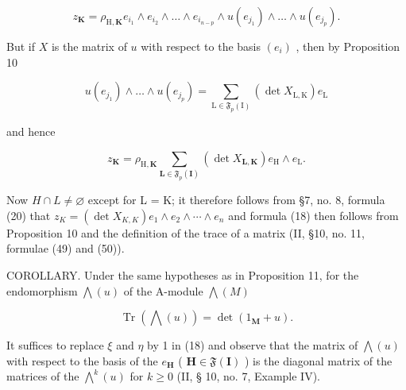 \[
z _ {\mathbf {K}} = \rho_ {\mathrm{H}, \mathbf {K}} e _ {i _ {1}} \wedge e _ {i _ {2}} \wedge \dots \wedge e _ {i _ {n - p}} \wedge u (e _ {j _ {1}}) \wedge \dots \wedge u (e _ {j _ {p}}).
\]

But if \(X\) is the matrix of \(u\) with respect to the basis \((e_i)\) , then by Proposition 10

\[
u (e _ {j _ {1}}) \wedge \dots \wedge u (e _ {j _ {p}}) = \sum_ {\mathrm{L} \in \mathfrak {F} _ {p} (\mathrm{I})} (\det X _ {\mathrm{L}, \mathrm{K}}) e _ {\mathrm{L}}
\]

and hence

\[
z _ {\mathbf {K}} = \rho_ {\mathrm{H}, \mathbf {K}} \sum_ {\mathbf {L} \in \mathfrak {F} _ {p} (\mathbf {I})} (\det X _ {\mathbf {L}, \mathbf {K}}) e _ {\mathrm{H}} \wedge e _ {\mathrm{L}}.
\]

Now \(H \cap L \neq \varnothing\) except for L = K; it therefore follows from §7, no. 8, formula (20) that \(z_{K} = (\det X_{K,K})e_{1} \wedge e_{2} \wedge \cdots \wedge e_{n}\) and formula (18) then follows from Proposition 10 and the definition of the trace of a matrix (II, §10, no. 11, formulae (49) and (50)).

COROLLARY. Under the same hypotheses as in Proposition 11, for the endomorphism \(\bigwedge(u)\) of the A-module \(\bigwedge(M)\)

\[
\operatorname{Tr} (\bigwedge (u)) = \det (1 _ {\mathbf {M}} + u).\tag{19}
\]

It suffices to replace \(\xi\) and \(\eta\) by 1 in (18) and observe that the matrix of \(\bigwedge(u)\) with respect to the basis of the \(e_{\mathbf{H}}\) ( \(\mathbf{H} \in \mathfrak{F}(\mathbf{I})\) ) is the diagonal matrix of the matrices of the \(\bigwedge^{k}(u)\) for \(k \geqslant 0\) (II, § 10, no. 7, Example IV).


